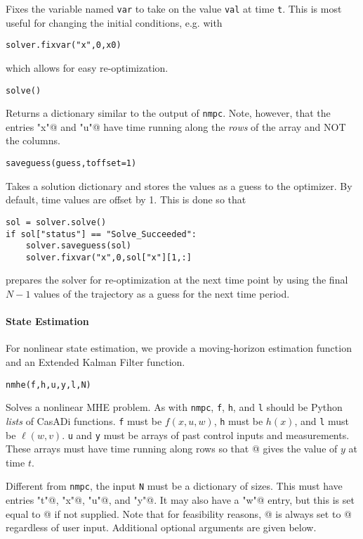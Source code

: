 \documentclass{article}
\newcommand{\funcname}[1]{\vspace{.25em}\noindent\texttt{#1}\vspace{.25em}}
\newcommand{\casadi}{CasADi}
\begin{document}
\begin{multicols}{2}
Fixes the variable named \texttt{var} to take on the value \texttt{val} at time \texttt{t}.
This is most useful for changing the initial conditions, e.g. with
%
\begin{lstlisting}[frame=L]
solver.fixvar("x",0,x0)
\end{lstlisting}
%
which allows for easy re-optimization.

\funcname{solve()}

Returns a dictionary similar to the output of \texttt{nmpc}.
Note, however, that the entries \lstinline@"x"@ and \lstinline@"u"@ have time running along the \emph{rows} of the array and NOT the columns.

\funcname{saveguess(guess,toffset=1)}

Takes a solution dictionary and stores the values as a guess to the optimizer.
By default, time values are offset by 1. This is done so that
%
\begin{lstlisting}[frame=L]
sol = solver.solve()
if sol["status"] == "Solve_Succeeded":
    solver.saveguess(sol)
    solver.fixvar("x",0,sol["x"][1,:]
\end{lstlisting}
%
prepares the solver for re-optimization at the next time point by using the final $N-1$ values of the trajectory as a guess for the next time period.

\paragraph*{State Estimation}

For nonlinear state estimation, we provide a moving-horizon estimation function and an Extended Kalman Filter function.

\funcname{nmhe(f,h,u,y,l,N)}

Solves a nonlinear MHE problem.
As with \texttt{nmpc}, \texttt{f}, \texttt{h}, and \texttt{l} should be Python \emph{lists} of \casadi{} functions.
\texttt{f} must be $f(x,u,w)$, \texttt{h} must be $h(x)$, and \texttt{l} must be $\ell(w,v)$.
\texttt{u} and \texttt{y} must be arrays of past control inputs and measurements.
These arrays must have time running along rows so that \lstinline@y[t,:]@ gives the value of $y$ at time $t$.

Different from \texttt{nmpc}, the input \texttt{N} must be a dictionary of sizes.
This must have entries \lstinline@"t"@, \lstinline@"x"@, \lstinline@"u"@, and \lstinline@"y"@.
It may also have a \lstinline@"w"@ entry, but this is set equal to \lstinline@N["x"]@ if not supplied.
Note that for feasibility reasons, \lstinline@N["v"]@ is always set to \lstinline@N["y"]@ regardless of user input. Additional optional arguments are given below.


\end{multicols}
\end{document}
